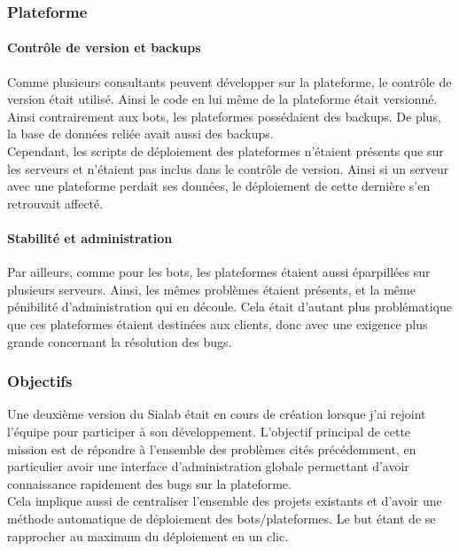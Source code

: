 \documentclass{article} %
\begin{document}
{\subsubsection{Plateforme}

\paragraph{Contrôle de version et backups}
Comme plusieurs consultants peuvent développer sur la plateforme, le contrôle de version était utilisé. Ainsi le code en lui même de la plateforme était versionné. Ainsi contrairement aux bots, les plateformes possédaient des backups. De plus, la base de données reliée avait aussi des backups.\\
Cependant, les scripts de déploiement des plateformes n'étaient présents que sur les serveurs et n'étaient pas inclus dans le contrôle de version. Ainsi si un serveur avec une plateforme perdait ses données, le déploiement de cette dernière s'en retrouvait affecté. \\

\paragraph{Stabilité et administration}
Par ailleurs, comme pour les bots, les plateformes étaient aussi éparpillées sur plusieurs serveurs. Ainsi, les mêmes problèmes étaient présents, et la même pénibilité d'administration qui en découle. Cela était d'autant plus problématique que ces plateformes étaient destinées aux clients, donc avec une exigence plus grande concernant la résolution des bugs.

\subsubsection{Objectifs}
Une deuxième version du Sialab était en cours de création lorsque j'ai rejoint l'équipe pour participer à son développement. L'objectif principal de cette mission est de répondre à l'ensemble des problèmes cités précédemment, en particulier avoir une interface d'administration globale permettant d'avoir connaissance rapidement des bugs sur la plateforme.\\

Cela implique aussi de centraliser l'ensemble des projets existants et d'avoir une méthode automatique de déploiement des bots/plateformes. Le but étant de se rapprocher au maximum du déploiement en un clic.\\

}
\end{document}
